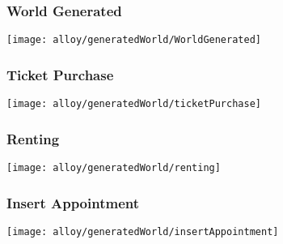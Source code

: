 	\begin{landscape}
		\subsubsection{World Generated}
			\texttt{[image: alloy/generatedWorld/WorldGenerated]}
	
		\subsubsection{Ticket Purchase}
			\texttt{[image: alloy/generatedWorld/ticketPurchase]}
	
		\subsubsection{Renting}
			\texttt{[image: alloy/generatedWorld/renting]}
		
		\subsubsection{Insert Appointment}
			\texttt{[image: alloy/generatedWorld/insertAppointment]}
	\end{landscape}
	